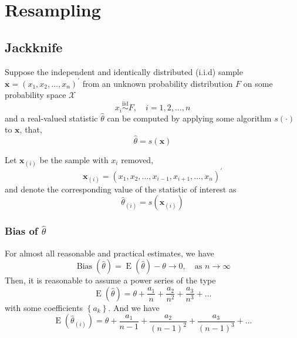 \chapter{Resampling}

\section{Jackknife}

Suppose the independent and identically distributed (i.i.d) sample $\boldsymbol{x}=\left(x_{1},x_{2},\ldots,x_{n}\right)^{\prime}$ from an unknown probability distribution $F$ on some probability space $\mathcal{X}$
\begin{equation}
    x_{i}\stackrel{\text{iid}}{\sim}F,\quad i=1,2,\ldots,n
\end{equation}
and a real-valued statistic $\hat{\theta}$ can be computed by applying some algorithm $s(\cdot)$ to $\mathbf{x}$, that,
\begin{equation}
    \hat{\theta}=s(\mathbf{x})
\end{equation}

Let $\mathbf{x}_{(i)}$ be the sample with $x_{i}$ removed,
\begin{equation}
    \mathbf{x}_{(i)}=\left(x_{1},x_{2},\ldots,x_{i-1},x_{i+1},\ldots,x_{n}\right)^{\prime}
\end{equation}
and denote the corresponding value of the statistic of interest as
\begin{equation}
    \hat{\theta}_{(i)}=s\left(\mathbf{x}_{(i)}\right)
\end{equation}

\subsection{Bias of $\hat{\theta}$}

For almost all reasonable and practical estimates, we have \begin{equation}
    \operatorname{Bias}(\hat{\theta})=\operatorname{E}(\hat{\theta})-\theta\rightarrow 0,\quad\text{as }n\rightarrow\infty
\end{equation}
Then, it is reasonable to assume a power series of the type
\begin{equation}
    \operatorname{E}(\hat{\theta})=\theta+\frac{a_{1}}{n}+\frac{a_{2}}{n^{2}}+\frac{a_{3}}{n^{3}}+\ldots
\end{equation}
with some coefficients $\left\{a_{k}\right\}$. And we have
\begin{equation}
    \operatorname{E}(\hat{\theta}_{(i)})=\theta+\frac{a_{1}}{n-1}+\frac{a_{2}}{\left(n-1\right)^{2}}+\frac{a_{3}}{\left(n-1\right)^{3}}+\ldots
\end{equation}

